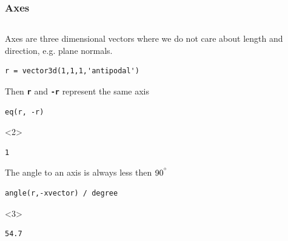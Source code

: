 \documentclass[compress]{beamer}
\begin{document}
\begin{frame}[fragile]
  \frametitle{Axes}

  \begin{columns}
    \begin{column}{8.5cm}
      \begin{overlayarea}{8.5cm}{8cm}
        Axes are three dimensional vectors where we do not care about length and
        direction, e.g. plane normals.

\begin{lstlisting}[style=input]
r = vector3d(1,1,1,'antipodal')
\end{lstlisting}

\medskip
\pause

Then \textbf{\texttt{r}} and \textbf{\texttt{-r}} represent the same axis
\begin{lstlisting}[style=input]
eq(r, -r)
\end{lstlisting}
\begin{onlyenv}<2>
  \vspace{-0.3cm}
\begin{lstlisting}[style=output]
  1
\end{lstlisting}
\end{onlyenv}

\medskip
\pause

The angle to an axis is always less then $90^{^\circ}$
\begin{lstlisting}[style=input]
angle(r,-xvector) / degree
\end{lstlisting}
\begin{onlyenv}<3>
  \vspace{-0.3cm}
\begin{lstlisting}[style=output]
  54.7
\end{lstlisting}
\end{onlyenv}

\medskip
\pause


\end{overlayarea}
\end{column}
\end{columns}
\end{frame}
\end{document}
